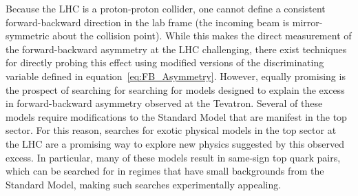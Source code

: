 Because the LHC is a proton-proton collider, one cannot define a consistent forward-backward direction in the lab frame (the incoming beam is mirror-symmetric about the collision point).
While this makes the direct measurement of the forward-backward asymmetry at the LHC challenging, there exist techniques for directly probing this effect using modified versions of the discriminating variable defined in equation~\ref{eq:FB_Asymmetry}.
However, equally promising is the prospect of searching for searching for models designed to explain the excess in forward-backward asymmetry observed at the Tevatron.
Several of these models require modifications to the Standard Model that are manifest in the top sector.
For this reason, searches for exotic physical models in the top sector at the LHC are a promising way to explore new physics suggested by this observed excess.
In particular, many of these models result in same-sign top quark pairs, which can be searched for in regimes that have small backgrounds from the Standard Model, making such searches experimentally appealing.

